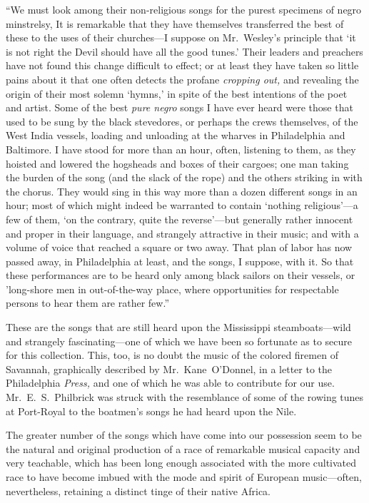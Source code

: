 \documentclass[a5paper,10pt]{book}
\begin{document}
``We must look among their non-religious songs for the purest
specimens of negro minstrelsy, It is remarkable that they have
themselves transferred the best of these to the uses of their
churches---I suppose on Mr.~Wesley's principle that `it is not right
the Devil should have all the good tunes.'  Their leaders and
preachers have not found this change difficult to effect; or at least
they have taken so little pains about it that one often detects the
profane \emph{cropping out,} and revealing the origin of their most
solemn `hymns,' in spite of the best intentions of the poet and
artist.  Some of the best \emph{pure negro} songs I have ever heard
were those that used to be sung by the black stevedores, or perhaps
the crews themselves, of the West India vessels, loading and unloading
at the wharves in Philadelphia and Baltimore.  I have stood for more
than an hour, often, listening to them, as they hoisted and lowered
the hogsheads and boxes of their cargoes; one man taking the burden of
the song (and the slack of the rope) and the others striking in with
the chorus.  They would sing in this way more than a dozen different
songs in an hour; most of which might indeed be warranted to contain
`nothing religious'---a few of them, `on the contrary, quite the
reverse'---but generally rather innocent and proper in their language,
and strangely attractive in their music; and with a volume of voice
that reached a square or two away.  That plan of labor has now passed
away, in Philadelphia at least, and the songs, I suppose, with it.  So
that these performances are to be heard only among black sailors on
their vessels, or 'long-shore men in out-of-the-way place, where
opportunities for respectable persons to hear them are rather few.''

These are the songs that are still heard upon the Mississippi
steamboats---wild and strangely fascinating---one of which we have
been so fortunate as to secure for this collection.  This, too, is no
doubt the music of the colored firemen of Savannah, graphically
described by Mr.~Kane~O'Donnel, in a letter to the Philadelphia
\emph{Press,} and one of which he was able to contribute for our use.
Mr.~E.~S.~Philbrick was struck with the resemblance of some of the
rowing tunes at Port-Royal to the boatmen's songs he had heard upon
the Nile.

The greater number of the songs which have come into our possession
seem to be the natural and original production of a race of remarkable
musical capacity and very teachable, which has been long enough
associated with the more cultivated race to have become imbued with
the mode and spirit of European music---often, nevertheless, retaining
a distinct tinge of their native Africa.
\end{document}
